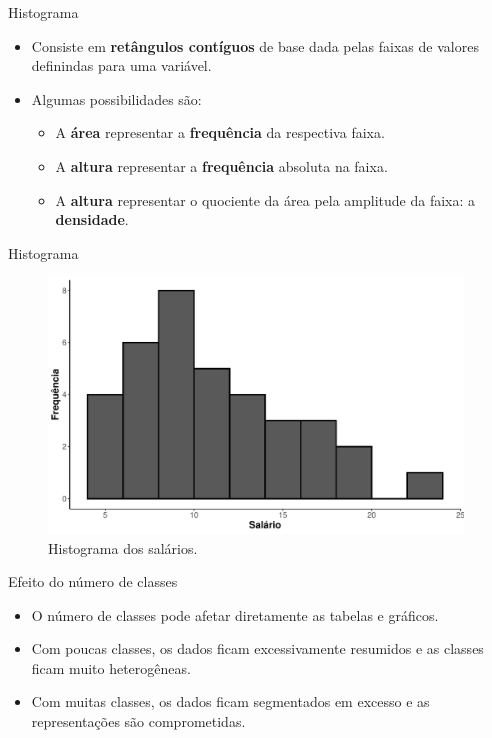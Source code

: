 \documentclass[
  ignorenonframetext,
  serif,
  professionalfont,
  usenames,
  dvipsnames,
  aspectratio = 169]{beamer}
\providecommand{\tightlist}{%
  \setlength{\itemsep}{0pt}\setlength{\parskip}{0pt}}
\renewcommand{\tightlist}{%
  \setlength{\itemsep}{0\baselineskip}
  \setlength{\parskip}{0.25\baselineskip}
}
\begin{document}
\begin{frame}{Histograma}
\label{histograma}
\begin{itemize}
\item
  Consiste em \textbf{retângulos contíguos} de base dada pelas faixas de
  valores definindas para uma variável.
\item
  Algumas possibilidades são:

  \begin{itemize}
  \tightlist
  \item
    A \textbf{área} representar a \textbf{frequência} da respectiva
    faixa.
  \item
    A \textbf{altura} representar a \textbf{frequência} absoluta na
    faixa.
  \item
    A \textbf{altura} representar o quociente da área pela amplitude da
    faixa: a \textbf{densidade}.
  \end{itemize}
\end{itemize}
\end{frame}

\begin{frame}{Histograma}
\label{histograma-1}
\begin{figure}

{\centering \includegraphics[width=11cm]{encontro1_files/figure-beamer/unnamed-chunk-50-1} 

}

\caption{Histograma dos salários.}\label{fig:unnamed-chunk-50}
\end{figure}
\end{frame}

\begin{frame}{Efeito do número de classes}
\label{efeito-do-nuxfamero-de-classes}
\begin{itemize}
\item
  O número de classes pode afetar diretamente as tabelas e gráficos.
\item
  Com poucas classes, os dados ficam excessivamente resumidos e as
  classes ficam muito heterogêneas.
\item
  Com muitas classes, os dados ficam segmentados em excesso e as
  representações são comprometidas.
\end{itemize}
\end{frame}
\end{document}
